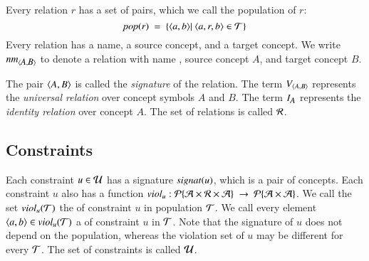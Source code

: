 \documentclass{elsarticle}
\begin{document}
	Every relation $r$ has a set of pairs, which we call the population of $r$:
\begin{equation}
	\pop{r}\ =\ \{ \pair{a}{b}|\ \triple{a}{r}{b}\in\triples\}
\end{equation}
	Every relation has a name, a source concept, and a target concept.
	We write $\text{\it nm\/}_{\langle{\text{\it \small A\/}},{\text{\it \small B\/}}\rangle}$ to denote a relation with name , source concept $A$, and target concept $B$.

	The pair $\langle{A},{B}\rangle$ is called the \emph{signature} of the relation.
	The term $V_{\langle{A},{B}\rangle}$ represents the \emph{universal relation} over concept symbols $A$ and $B$.
	The term $I_{\text{\it \small A\/}}$ represents the \emph{identity relation} over concept $A$.
	The set of relations is called $\mathcal{R}$.

	
\subsection{Constraints}
	Each constraint $u\in\mathcal{U}$ has a signature $\text{\it signat\/}(u)$, which is a pair of concepts.
	Each constraint $u$ also has a function $\id{viol}_u:\powerset{\atoms\times\rels\times\atoms}\ \rightarrow\ \powerset{\atoms\times\atoms}$.
	We call the set $\text{\it viol\/}_{u}(\mathcal{T})$ the  of constraint $u$ in population $\mathcal{T}$.
	We call every element $\langle{a},{b}\rangle\in\text{\it viol\/}_{u}(\mathcal{T})$ a  of constraint $u$ in $\mathcal{T}$.
	Note that the signature of $u$ does not depend on the population, whereas the violation set of $u$ may be different for every $\mathcal{T}$.
	The set of constraints is called $\mathcal{U}$.
\end{document}
